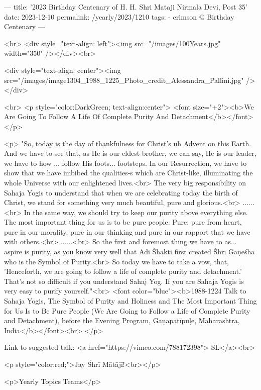 ---
title: '2023 Birthday Centenary of H. H. Shri Mataji Nirmala Devi, Post 35'
date: 2023-12-10
permalink: /yearly/2023/1210
tags:
  - crimson @ Birthday Centenary
---

<br>
<div style="text-align: left"><img src="/images/100Years.jpg" width="350" /></div><br>

<div style="text-align: center"><img src="/images/image1304_1988_1225_Photo_credit_Alessandra_Pallini.jpg" /></div>

<br>
<p style="color:DarkGreen; text-align:center">
<font size="+2"><b>We Are Going To Follow A Life Of Complete Purity And Detachment</b></font>
</p>

<p>
"So, today is the day of thankfulness for Christ's uh Advent on this Earth. And we have to see that, as He is our eldest brother, we can say, He is our leader, we have to how ... follow His foots... footsteps. In our Resurrection, we have to show that we have imbibed the qualities-s which are Christ-like, illuminating the whole Universe with our enlightened lives.<br>
The very big responsibility on Sahaja Yogis to understand that when we are celebrating today the birth of Christ, we stand for something very much beautiful, pure and glorious.<br>
......<br>
In the same way, we should try to keep our purity above everything else. The most important thing for us is to be pure people. Pure: pure from heart, pure in our morality, pure in our thinking and pure in our rapport that we have with others.<br>
......<br>
So the first and foremost thing we have to as... aspire is purity, as you know very well that Ādi Śhakti first created Śhrī Gaṇeśha who is the Symbol of Purity.<br>
So today we have to take a vow, that, 'Henceforth, we are going to follow a life of complete purity and detachment.' That's not so difficult if you understand Sahaj Yog. If you are Sahaja Yogis is very easy to purify yourself."<br>
<font color="blue"><b>1988-1224 Talk to Sahaja Yogis, The Symbol of Purity and Holiness and The Most Important Thing for Us Is to Be Pure People (We Are Going to Follow a Life of Complete Purity and Detachment), before the Evening Program, Gaṇapatīpuḷe, Maharashtra, India</b></font><br>
</p>

Link to suggested talk: <a href="https://vimeo.com/788172398"> SL</a><br>

<p style="color:red;">Jay Śhrī Mātājī!<br></p>

<p>Yearly Topics Teams</p>